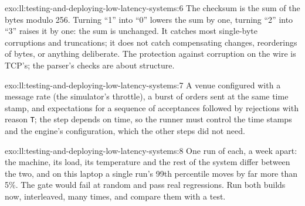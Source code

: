 \begin{solution}{exo:ll:testing-and-deploying-low-latency-systems:6}
The checksum is the sum of the bytes modulo 256. Turning ``1'' into ``0'' lowers the sum by one, turning ``2'' into ``3'' raises
it by one: the sum is unchanged. It catches most single-byte corruptions and truncations; it does not catch compensating
changes, reorderings of bytes, or anything deliberate. The protection against corruption on the wire is TCP's; the parser's
checks are about structure.
\end{solution}

\begin{solution}{exo:ll:testing-and-deploying-low-latency-systems:7}
A venue configured with a message rate (the simulator's throttle), a burst of orders sent at the same time stamp, and
expectations for a sequence of acceptances followed by rejections with reason \texttt{T}; the step depends on time, so the
runner must control the time stamps and the engine's configuration, which the other steps did not need.
\end{solution}

\begin{solution}{exo:ll:testing-and-deploying-low-latency-systems:8}
One run of each, a week apart: the machine, its load, its temperature and the rest of the system differ between the two, and
on this laptop a single run's 99th percentile moves by far more than 5\%. The gate would fail at random and pass real
regressions. Run both builds now, interleaved, many times, and compare them with a test.
\end{solution}


